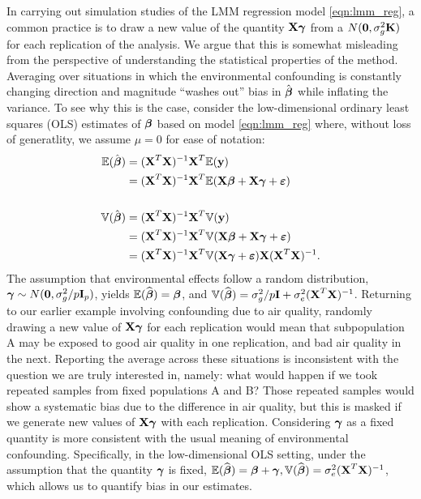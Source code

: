 In carrying out simulation studies of the LMM regression model \eqref{eqn:lmm_reg}, a common practice \citep{Rakitsch2012, bhatnagar2019simultaneous} is to draw a new value of the quantity $\textbf{X}\boldsymbol{\gamma}$ from a $N(\boldsymbol{0}, \sigma^2_g \textbf{K})$ for each replication of the analysis.  We argue that this is somewhat misleading from the perspective of understanding the statistical properties of the method. Averaging over situations in which the environmental confounding is constantly changing direction and magnitude ``washes out'' bias in $\hat{\boldsymbol{\beta}}$ while inflating the variance. To see why this is the case, consider the low-dimensional ordinary least squares (OLS) estimates of $\boldsymbol{\beta}$ based on model \eqref{eqn:lmm_reg} where, without loss of generatlity, we assume $\mu = 0$ for ease of notation: 
\begin{align*}
    \mathbb{E}(\hat{\boldsymbol{\beta}}) &= (\textbf{X}^T \textbf{X})^{-1} \textbf{X}^T \mathbb{E}(\textbf{y})\\
    &=  (\textbf{X}^T \textbf{X})^{-1} \textbf{X}^T \mathbb{E}(\textbf{X}\boldsymbol{\beta} + \textbf{X}\boldsymbol{\gamma} + \boldsymbol{\varepsilon})\\
    &\quad\\
    \mathbb{V}(\hat{\boldsymbol{\beta}}) &= (\textbf{X}^T \textbf{X})^{-1} \textbf{X}^T \mathbb{V}(\textbf{y})\\
    &=  (\textbf{X}^T \textbf{X})^{-1} \textbf{X}^T \mathbb{V}(\textbf{X}\boldsymbol{\beta} + \textbf{X}\boldsymbol{\gamma} + \boldsymbol{\varepsilon})\\
    &=  (\textbf{X}^T \textbf{X})^{-1} \textbf{X}^T \mathbb{V}(\textbf{X}\boldsymbol{\gamma} + \boldsymbol{\varepsilon}) \textbf{X}  (\textbf{X}^T \textbf{X})^{-1}.
\end{align*}
The assumption that environmental effects follow a random distribution, $\boldsymbol{\gamma} \sim N(\boldsymbol{0}, \sigma^2_g / p \textbf{I}_p)$, yields $\mathbb{E}(\widehat{\boldsymbol{\beta}}) = \boldsymbol{\beta}$, and $\mathbb{V}(\widehat{\boldsymbol{\beta}}) = \sigma^2_g/p \textbf{I} + \sigma^2_e (\textbf{X}^T \textbf{X})^{-1}$. Returning to our earlier example involving confounding due to air quality, randomly drawing a new value of $\textbf{X}\boldsymbol{\gamma}$ for each replication would mean that subpopulation A may be exposed to good air quality in one replication, and bad air quality in the next. Reporting the average across these situations is inconsistent with the question we are truly interested in, namely: what would happen if we took repeated samples from fixed populations A and B? Those repeated samples would show a systematic bias due to the difference in air quality, but this is masked if we generate new values of $\textbf{X}\boldsymbol{\gamma}$ with each replication. Considering $\boldsymbol{\gamma}$ as a fixed quantity is more consistent with the usual meaning of environmental confounding. Specifically, in the low-dimensional OLS setting, under the assumption that the quantity $\boldsymbol{\gamma}$ is fixed, $\mathbb{E}(\widehat{\boldsymbol{\beta}}) = \boldsymbol{\beta} + \boldsymbol{\gamma}, \mathbb{V}(\widehat{\boldsymbol{\beta}}) = \sigma^2_e (\textbf{X}^T \textbf{X})^{-1}$, which allows us to quantify bias in our estimates. 

